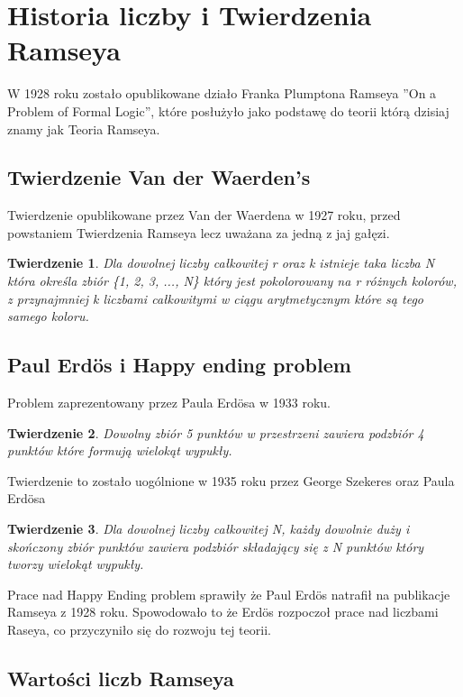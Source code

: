 \documentclass[11pt]{article}
\newtheorem{theorem}{Twierdzenie}
\begin{document}
\section{Historia liczby i Twierdzenia Ramseya}

W 1928 roku zostało opublikowane działo Franka Plumptona Ramseya ''On a Problem of Formal Logic'', które posłużyło jako podstawę do teorii którą dzisiaj znamy jak Teoria Ramseya. 


\subsection{Twierdzenie Van der Waerden's}
Twierdzenie opublikowane przez Van der Waerdena w 1927 roku, przed powstaniem Twierdzenia Ramseya lecz uważana za jedną z jaj gałęzi. 

\begin{theorem}
Dla dowolnej liczby całkowitej r oraz k istnieje taka liczba N która określa zbiór \{1, 2, 3, ..., N\} który jest pokolorowany na r różnych kolorów, z przynajmniej k liczbami całkowitymi w ciągu arytmetycznym które są tego samego koloru.
\end{theorem}

\subsection{Paul Erd\"os i Happy ending problem}

Problem zaprezentowany przez Paula Erd\"osa w 1933 roku.

\begin{theorem}
Dowolny zbiór 5 punktów w przestrzeni zawiera podzbiór 4 punktów które formują wielokąt wypukły.
\end{theorem}

Twierdzenie to zostało uogólnione w 1935 roku przez George Szekeres oraz Paula Erd\"osa

\begin{theorem}
Dla dowolnej liczby całkowitej N, każdy dowolnie duży i skończony zbiór punktów zawiera podzbiór składający się z N punktów który tworzy wielokąt wypukły.
\end{theorem}

Prace nad Happy Ending problem sprawiły że Paul Erd\"os natrafił na publikacje Ramseya z 1928 roku. Spowodowało to że Erd\"os rozpoczoł prace nad liczbami Raseya, co przyczyniło się do rozwoju tej teorii.

\subsection{Wartości liczb Ramseya}
\end{document}
